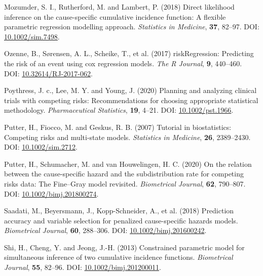 \documentclass[
  letterpaper,
  DIV=11,
  numbers=noendperiod]{scrreprt}
\newlength{\cslhangindent}
\newlength{\cslentryspacingunit} %
\newenvironment{CSLReferences}[2] %
 {%
  \setlength{\parindent}{0pt}
  \ifodd #1
  \let\oldpar\par
  \def\par{\hangindent=\cslhangindent\oldpar}
  \fi
  \setlength{\parskip}{#2\cslentryspacingunit}
 }%
 {}
\begin{document}
\begin{CSLReferences}{1}{0}
\leavevmode{}%
Mozumder, S. I., Rutherford, M. and Lambert, P. (2018) Direct likelihood
inference on the cause-specific cumulative incidence function: {A}
flexible parametric regression modelling approach. \emph{Statistics in
Medicine}, \textbf{37}, 82--97. DOI:
\href{https://doi.org/10.1002/sim.7498}{10.1002/sim.7498}.

\leavevmode{}%
Ozenne, B., Sørensen, A. L., Scheike, T., et al. (2017)
{riskRegression}: {Predicting} the risk of an event using cox regression
models. \emph{The R Journal}, \textbf{9}, 440--460. DOI:
\href{https://doi.org/10.32614/RJ-2017-062}{10.32614/RJ-2017-062}.

\leavevmode{}%
Poythress, J. c., Lee, M. Y. and Young, J. (2020) Planning and analyzing
clinical trials with competing risks: {Recommendations} for choosing
appropriate statistical methodology. \emph{Pharmaceutical Statistics},
\textbf{19}, 4--21. DOI:
\href{https://doi.org/10.1002/pst.1966}{10.1002/pst.1966}.

\leavevmode{}%
Putter, H., Fiocco, M. and Geskus, R. B. (2007) Tutorial in
biostatistics: Competing risks and multi-state models. \emph{Statistics
in Medicine}, \textbf{26}, 2389--2430. DOI:
\href{https://doi.org/10.1002/sim.2712}{10.1002/sim.2712}.

\leavevmode{}%
Putter, H., Schumacher, M. and van Houwelingen, H. C. (2020) On the
relation between the cause-specific hazard and the subdistribution rate
for competing risks data: {The Fine}--{Gray} model revisited.
\emph{Biometrical Journal}, \textbf{62}, 790--807. DOI:
\href{https://doi.org/10.1002/bimj.201800274}{10.1002/bimj.201800274}.

\leavevmode{}%
Saadati, M., Beyersmann, J., Kopp-Schneider, A., et al. (2018)
Prediction accuracy and variable selection for penalized cause-specific
hazards models. \emph{Biometrical Journal}, \textbf{60}, 288--306. DOI:
\href{https://doi.org/10.1002/bimj.201600242}{10.1002/bimj.201600242}.

\leavevmode{}%
Shi, H., Cheng, Y. and Jeong, J.-H. (2013) Constrained parametric model
for simultaneous inference of two cumulative incidence functions.
\emph{Biometrical Journal}, \textbf{55}, 82--96. DOI:
\href{https://doi.org/10.1002/bimj.201200011}{10.1002/bimj.201200011}.


\end{CSLReferences}
\end{document}
